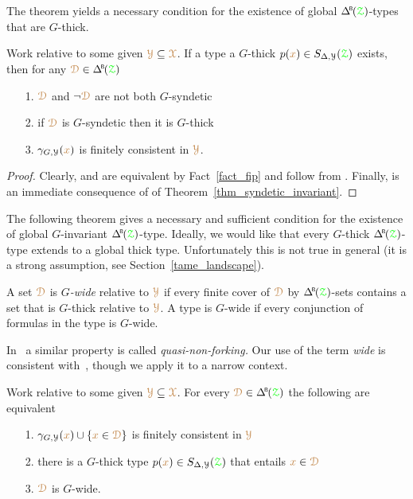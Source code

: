 The theorem yields a necessary condition for the existence of global $\BDelta({\grZ})$-types that are $G$-thick.

\begin{corollary}\label{corol_def_mu}
  Work relative to some given ${\color{brown}\EuScript Y}\subseteq{\color{brown}\EuScript X}$.
  If a type a $G$-thick $p({\color{brown} x})\in S_{\Delta,\EuScript Y}({\color{green}\EuScript Z})$ exists, then for any $\mrD\in\BDelta({\grZ})$
  \begin{itemize}
    \item[1.] ${\color{brown}\EuScript D}$ and $\neg{\color{brown}\EuScript D}$ are not both $G$-syndetic
    \item[2.] if ${\color{brown}\EuScript D}$ is $G$-syndetic then it is $G$-thick
    \item[3.] $\gamma_{G,\EuScript Y}({\color{brown} x})$ is finitely consistent in ${\color{brown}\EuScript Y}$.\smallskip
  \end{itemize}
\end{corollary}

\begin{proof}
  Clearly,  and  are equivalent by Fact~\ref{fact_fip} and follow from .
  Finally,  is an immediate consequence of  of Theorem~\ref{thm_syndetic_invariant}.
\end{proof}

The following theorem gives a necessary and sufficient condition for the  existence of global $G$-invariant $\BDelta({\grZ})$-type.
Ideally, we would like that every $G$-thick $\BDelta({\grZ})$-type extends to a global thick type.
Unfortunately this is not true in general (it is a strong assumption, see Section~\ref{tame_landscape}).

A set ${\color{brown}\EuScript D}$ is \emph{$G$-wide\/} relative to ${\color{brown}\EuScript Y}$ if every finite cover of ${\color{brown}\EuScript D}$ by $\BDelta({\grZ})$-sets contains a set that is $G$-thick relative to ${\color{brown}\EuScript Y}$.
A type is $G$-wide if every conjunction of formulas in the type is $G$-wide.

In~\cite{CK} a similar property is called \textit{quasi-non-forking.}
Our use of the term \textit{wide\/} is consistent with~\cite{Hr}, though we apply it to a narrow context.

\begin{theorem}\label{thm_syndetic_invariant2}
  Work relative to some given ${\color{brown}\EuScript Y}\subseteq{\color{brown}\EuScript X}$.
  For every $\mrD\in\BDelta(\grZ)$ the following are equivalent 
  \begin{itemize}
    \item[1.] $\gamma_{G,\EuScript Y}({\color{brown} x})\cup\{{\color{brown} x}\in{\color{brown}\EuScript D}\}$ is finitely consistent in ${\color{brown}\EuScript Y}$
    \item[2.] there is a $G$-thick type $p({\color{brown} x})\in S_{\Delta,\EuScript Y}({\color{green}\EuScript Z})$ that entails ${\color{brown} x}\in{\color{brown}\EuScript D}$
    \item[3.] ${\color{brown}\EuScript D}$ is $G$-wide.\smallskip
  \end{itemize}
\end{theorem}

